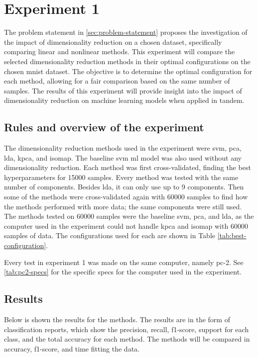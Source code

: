 \section{Experiment 1}\label{sec:experiment-1}
The problem statement in \autoref{sec:problem-statement} proposes the investigation of the impact of dimensionality reduction on a chosen dataset, specifically comparing linear and nonlinear methods. This experiment will compare the selected dimensionality reduction methods in their optimal configurations on the chosen \gls{mnist} dataset. The objective is to determine the optimal configuration for each method, allowing for a fair comparison based on the same number of samples. The results of this experiment will provide insight into the impact of dimensionality reduction on machine learning models when applied in tandem.

\subsection{Rules and overview of the experiment}\label{subsec:experiment-1-rules}
The dimensionality reduction methods used in the experiment were \gls{svm}, \gls{pca}, \gls{lda}, \gls{kpca}, and \gls{isomap}. The baseline \gls{svm} \gls{ml} model was also used without any dimensionality reduction. Each method was first cross-validated, finding the best hyperparameters for 15000 samples. Every method was tested with the same number of components. Besides \gls{lda}, it can only use up to 9 components. Then some of the methods were cross-validated again with 60000 samples to find how the methods performed with more data; the same components were still used. The methods tested on 60000 samples were the baseline \gls{svm}, \gls{pca}, and \gls{lda}, as the computer used in the experiment could not handle \gls{kpca} and \gls{isomap} with 60000 samples of data. The configurations used for each are shown in Table \ref{tab:best-configuration}.



Every test in experiment 1 was made on the same computer, namely pc-2. See \autoref{tab:pc2-specs} for the specific specs for the computer used in the experiment.


\subsection{Results}\label{subsec:experiment-1-results}
Below is shown the results for the methods. The results are in the form of classification reports, which show the precision, recall, f1-score, support for each class, and the total accuracy for each method. The methods will be compared in accuracy, f1-score, and time fitting the data.

